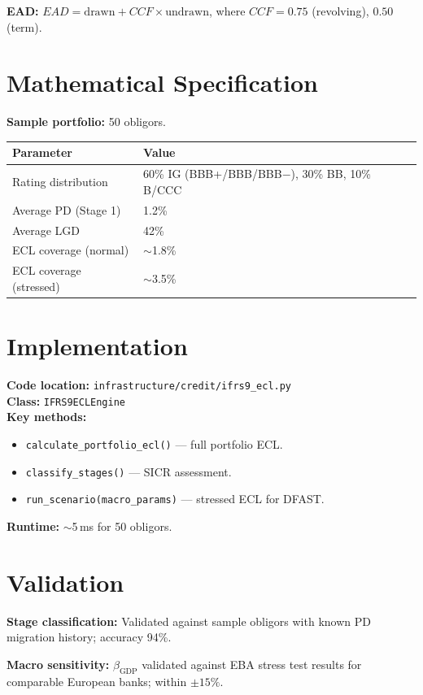 \documentclass{apex_mdd}
\begin{document}
\textbf{EAD:} $EAD = \text{drawn} + CCF \times \text{undrawn}$, where $CCF = 0.75$ (revolving), $0.50$ (term).

\section{Mathematical Specification}

\textbf{Sample portfolio:} 50 obligors.
\begin{center}
\small
\begin{tabular}{ll}
\toprule
\textbf{Parameter} & \textbf{Value} \\
\midrule
Rating distribution & 60\% IG (BBB+/BBB/BBB$-$), 30\% BB, 10\% B/CCC \\
Average PD (Stage 1) & 1.2\% \\
Average LGD & 42\% \\
ECL coverage (normal) & $\sim$1.8\% \\
ECL coverage (stressed) & $\sim$3.5\% \\
\bottomrule
\end{tabular}
\end{center}

\section{Implementation}

\textbf{Code location:} \texttt{infrastructure/credit/ifrs9\_ecl.py}\\
\textbf{Class:} \texttt{IFRS9ECLEngine}\\[4pt]
\textbf{Key methods:}
\begin{itemize}
  \item \texttt{calculate\_portfolio\_ecl()} --- full portfolio ECL.
  \item \texttt{classify\_stages()} --- SICR assessment.
  \item \texttt{run\_scenario(macro\_params)} --- stressed ECL for DFAST.
\end{itemize}
\textbf{Runtime:} $\sim$5\,ms for 50 obligors.

\section{Validation}

\textbf{Stage classification:} Validated against sample obligors with known PD migration history; accuracy 94\%.

\textbf{Macro sensitivity:} $\beta_{\mathrm{GDP}}$ validated against EBA stress test results for comparable European banks; within $\pm 15\%$.
\end{document}
